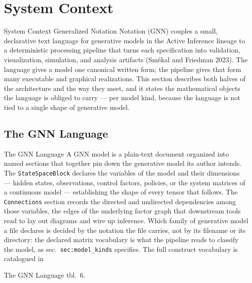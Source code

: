\documentclass[
  ignorenonframetext,
]{beamer}
\author{\texorpdfstring{}{}}
\date{}
\begin{document}
\section{System Context}\label{sec:system_context}

\begin{frame}[allowframebreaks]{System Context}
Generalized Notation Notation (GNN) couples a small, declarative text
language for generative models in the Active Inference lineage to a
deterministic processing pipeline that turns each specification into
validation, visualization, simulation, and analysis artifacts (Smékal
and Friedman 2023). The language gives a model one canonical written
form; the pipeline gives that form many executable and graphical
realizations. This section describes both halves of the architecture and
the way they meet, and it states the mathematical objects the language
is obliged to carry --- per model kind, because the language is not tied
to a single shape of generative model.
\end{frame}

\subsection{The GNN Language}\label{the-gnn-language}

\begin{frame}{The GNN Language}
A GNN model is a plain-text document organized into named sections that
together pin down the generative model its author intends. The
\texttt{StateSpaceBlock} declares the variables of the model and their
dimensions --- hidden states, observations, control factors, policies,
or the system matrices of a continuous model --- establishing the shape
of every tensor that follows. The \texttt{Connections} section records
the directed and undirected dependencies among those variables, the
edges of the underlying factor graph that downstream tools read to lay
out diagrams and wire up inference. Which family of generative model a
file declares is decided by the notation the file carries, not by its
filename or its directory: the declared matrix vocabulary is what the
pipeline reads to classify the model, as sec.~\texttt{sec:model\_kinds}
specifies. The full construct vocabulary is catalogued in
\end{frame}

\begin{frame}{The GNN Language}
tbl.~6.
\end{frame}
\end{document}
